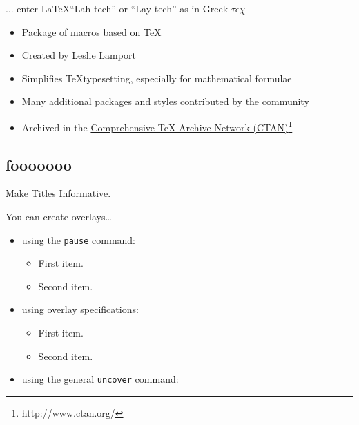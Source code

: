 \documentclass{beamer}
\begin{document}
\begin{frame}{... enter \LaTeX}{``Lah-tech'' or ``Lay-tech'' as in Greek {$\tau\epsilon\chi$}}

  \begin{itemize}
  \item
    Package of macros based on \TeX
  \item
    Created by Leslie Lamport
  \item
    Simplifies \TeX typesetting, especially for mathematical formulae
  \item
    Many additional packages and styles contributed by the community 
  \item
    Archived in the \hyperref[http://www.ctan.org]{Comprehensive TeX Archive Network (CTAN)}\footnote{http://www.ctan.org/}
  \end{itemize}
\end{frame}

\subsection{fooooooo}

\begin{frame}{Make Titles Informative.}

  You can create overlays\dots
  \begin{itemize}
  \item using the \texttt{pause} command:
    \begin{itemize}
    \item
      First item.
      \pause
    \item    
      Second item.
    \end{itemize}
  \item
    using overlay specifications:
    \begin{itemize}
    \item<3->
      First item.
    \item<4->
      Second item.
    \end{itemize}
  \item
    using the general \texttt{uncover} command:
    \begin{itemize}
    \end{itemize}
  \end{itemize}
\end{frame}
\end{document}
